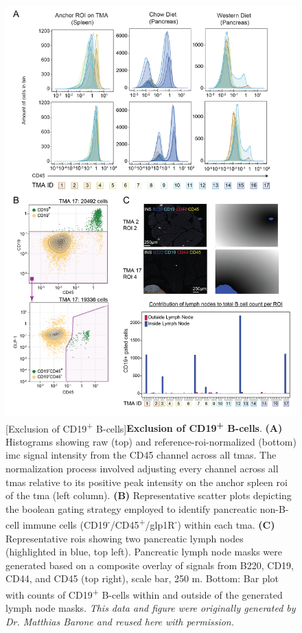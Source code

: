 

\begin{figure}[H]
    \centering
    \includegraphics[width=14cm]{Appendix2/Fig/F2-A2-01.png}
    [Exclusion of CD19\textsuperscript{+} B-cells]{\textbf{Exclusion of CD19\textsuperscript{+} B-cells}. \textbf{(A)} Histograms showing raw (top) and reference-\gls{roi}-normalized (bottom) \gls{imc} signal intensity from the CD45 channel across all \glspl{tma}. The normalization process involved adjusting every channel across all \glspl{tma} relative to its positive peak intensity on the anchor spleen \gls{roi} of the \gls{tma} (left column). \textbf{(B)} Representative scatter plots depicting the boolean gating strategy employed to identify pancreatic non-B-cell immune cells (CD19\textsuperscript{-}/CD45\textsuperscript{+}/\gls{glp1}R\textsuperscript{-}) within each \gls{tma}. \textbf{(C)} Representative \glspl{roi} showing two pancreatic lymph nodes (highlighted in blue, top left). Pancreatic lymph node masks were generated based on a composite overlay of signals from  B220, CD19, CD44, and CD45 (top right), scale bar, 250 \textmu m. Bottom: Bar plot with counts of CD19\textsuperscript{+} B-cells within and outside of the generated lymph node masks. \textit{This data and figure were originally generated by Dr. Matthias Barone and reused here with permission.}}

\end{figure}
